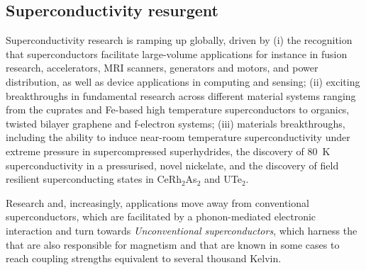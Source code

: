 \twocolumngrid


\subsection*{Superconductivity resurgent}
\noindent
Superconductivity research is ramping up globally, driven by (i) the recognition that superconductors facilitate large-volume applications for instance in fusion research, accelerators, MRI scanners, generators and motors, and power distribution, as well as device applications in computing and sensing; (ii) exciting breakthroughs in fundamental research across different material systems ranging from the cuprates and Fe-based high temperature superconductors to organics, twisted bilayer graphene and f-electron systems; (iii) materials breakthroughs, including the ability to induce near-room temperature superconductivity under extreme pressure in supercompressed superhydrides, the discovery of \SI{80}{\kelvin} superconductivity in a pressurised, novel nickelate, and the discovery of field resilient superconducting states in CeRh$_2$As$_2$ and UTe$_2$. 



Research and, increasingly, applications move away from conventional superconductors, which are facilitated by a phonon-mediated electronic interaction and turn towards \emph{Unconventional superconductors}, which harness the  that are also responsible for magnetism and that are
known in some cases to reach coupling strengths equivalent to several
thousand Kelvin. %

